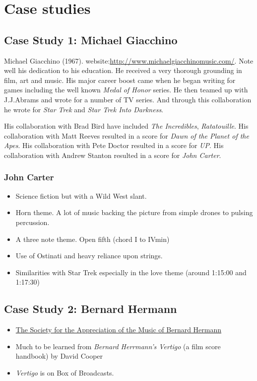 
\chapter{Case studies}
\label{casestudies}

\section{Case Study 1: Michael Giacchino}

Michael Giacchino (1967). website:\url{http://www.michaelgiacchinomusic.com/}. Note well his dedication to his education. He received a very thorough grounding in film, art and music. His major career boost came when he began writing for games including the well known \textit{Medal of Honor} series. He then teamed up with J.J.Abrams and wrote for a number of TV series. And through this collaboration he wrote for \textit{Star Trek} and \textit{Star Trek Into Darkness}.

His collaboration with Brad Bird have included \textit{The Incredibles}, \textit{Ratatouille}. His collaboration with Matt Reeves resulted in a score for \textit{Dawn of the Planet of the Apes}. His collaboration with Pete Doctor resulted in a score for \textit{UP}. His collaboration with Andrew Stanton resulted in a score for \textit{John Carter}.

\subsection{John Carter}
\begin{itemize}
\item Science fiction but with a Wild West slant.   
\item Horn theme. A lot of music backing the picture from simple drones to pulsing percussion.  
\item A three note theme. Open fifth (chord I to IVmin)
\item Use of Ostinati and heavy reliance upon strings.
\item Similarities with Star Trek especially in the love theme (around 1:15:00 and 1:17:30)
\end{itemize}

\section{Case Study 2: Bernard Hermann}
\begin{itemize}
\item \href{http://www.bernardherrmann.org/}
{The Society for the Appreciation of the Music of Bernard Hermann}
\item Much to be learned from \textit{Bernard Herrmann's Vertigo} (a film score handbook) by David Cooper \citep{cooper2001bernard}
\item \textit{Vertigo} is on Box of Broadcasts. 
\end{itemize}





